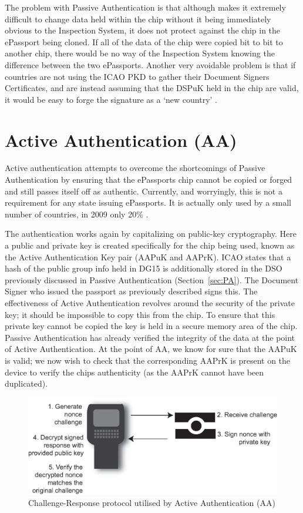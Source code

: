 \documentclass[12pt]{article}
\begin{document}
The problem with Passive Authentication is that although makes it extremely difficult to change data held within the chip without it being immediately obvious to the Inspection System, it does not protect against the chip in the ePassport being cloned. If all of the data of the chip were copied bit to bit to another chip, there would be no way of the Inspection System knowing the difference between the two ePassports. 
Another very avoidable problem is that if countries are not using the ICAO PKD to gather their Document Signers Certificates, and are instead assuming that the DSPuK held in the chip are valid, it would be easy to forge the signature as a `new country' \cite{ePassportsreloaded:2009ti}.

\section{Active Authentication (AA)}
\label{sec:AA}
Active authentication attempts to overcome the shortcomings of Passive Authentication by ensuring that the ePassports chip cannot be copied or forged and still passes itself off as authentic. Currently, and worryingly, this is not a requirement for any state issuing ePassports. It is actually only used by a small number of countries, in 2009 only 20\% \cite{ePassportsreloaded:2009ti}.

The authentication works again by capitalizing on public-key cryptography. Here a public and private key is created specifically for the chip being used, known as the Active Authentication Key pair (AAPuK and AAPrK). ICAO \cite{Anonymous:2006vu} states that a hash of the public group info held in DG15 is additionally stored in the DSO previously discussed in Passive Authentication (Section~\ref{sec:PA}). The Document Signer who issued the passport as previously described signs this. The effectiveness of Active Authentication revolves around the security of the private key; it should be impossible to copy this from the chip. To ensure that this private key cannot be copied the key is held in a secure memory area of the chip. Passive Authentication has already verified the integrity of the data at the point of Active Authentication. At the point of AA, we know for sure that the AAPuK is valid; we now wish to check that the corresponding AAPrK is present on the device to verify the chips authenticity (as the AAPrK cannot have been duplicated).

\begin{figure}
\centering
\includegraphics[width=5.5in]{AA-Challenge-Response.eps}
\caption{Challenge-Response protocol utilised by Active Authentication (AA)}
\label{fig:AA}
\end{figure}
\end{document}
